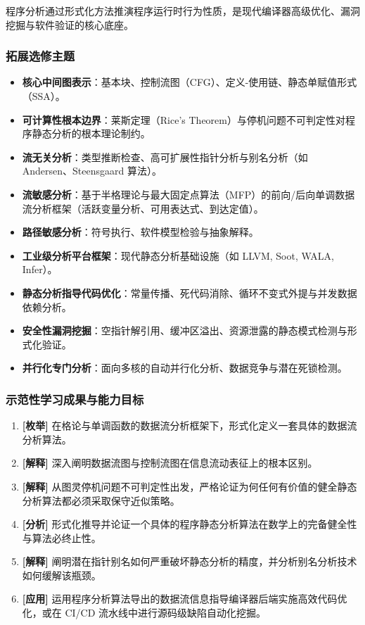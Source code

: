 程序分析通过形式化方法推演程序运行时行为性质，是现代编译器高级优化、漏洞挖掘与软件验证的核心底座。

\subsubsection{拓展选修主题}
\begin{itemize}
    \item \textbf{核心中间图表示}：基本块、控制流图（CFG）、定义-使用链、静态单赋值形式（SSA）。
    \item \textbf{可计算性根本边界}：莱斯定理（Rice's Theorem）与停机问题不可判定性对程序静态分析的根本理论制约。
    \item \textbf{流无关分析}：类型推断检查、高可扩展性指针分析与别名分析（如 Andersen、Steensgaard 算法）。
    \item \textbf{流敏感分析}：基于半格理论与最大固定点算法（MFP）的前向/后向单调数据流分析框架（活跃变量分析、可用表达式、到达定值）。
    \item \textbf{路径敏感分析}：符号执行、软件模型检验与抽象解释。
    \item \textbf{工业级分析平台框架}：现代静态分析基础设施（如 LLVM, Soot, WALA, Infer）。
    \item \textbf{静态分析指导代码优化}：常量传播、死代码消除、循环不变式外提与并发数据依赖分析。
    \item \textbf{安全性漏洞挖掘}：空指针解引用、缓冲区溢出、资源泄露的静态模式检测与形式化验证。
    \item \textbf{并行化专门分析}：面向多核的自动并行化分析、数据竞争与潜在死锁检测。
\end{itemize}

\subsubsection{示范性学习成果与能力目标}
\begin{enumerate}
    \item \textbf{[枚举]} 在格论与单调函数的数据流分析框架下，形式化定义一套具体的数据流分析算法。
    \item \textbf{[解释]} 深入阐明数据流图与控制流图在信息流动表征上的根本区别。
    \item \textbf{[解释]} 从图灵停机问题不可判定性出发，严格论证为何任何有价值的健全静态分析算法都必须采取保守近似策略。
    \item \textbf{[分析]} 形式化推导并论证一个具体的程序静态分析算法在数学上的完备健全性与算法必终止性。
    \item \textbf{[解释]} 阐明潜在指针别名如何严重破坏静态分析的精度，并分析别名分析技术如何缓解该瓶颈。
    \item \textbf{[应用]} 运用程序分析算法导出的数据流信息指导编译器后端实施高效代码优化，或在 CI/CD 流水线中进行源码级缺陷自动化挖掘。
\end{enumerate}

